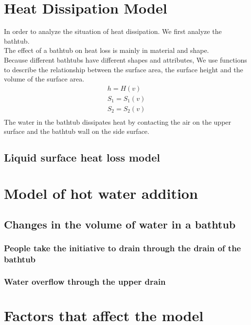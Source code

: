 \documentclass{mcmthesis}
\begin{document}
\section{Heat Dissipation Model}
In order to analyze the situation of heat dissipation. 
We first analyze the bathtub.\\
\indent The effect of a bathtub on heat loss is mainly in material and shape.\\
\indent Because different bathtubs have different shapes and attributes, We use functions to describe the relationship between the surface area, the surface height and the volume of the surface area.
\begin{equation}
\begin{split}
h=H(v)  \\
S_{1}=S_{1}(v) \\
S_{2}=S_{2}(v)  \\
\end{split}
\end{equation}
\indent The water in the bathtub dissipates heat by contacting the air on the upper surface and the bathtub wall on the side surface.

\subsection{Liquid surface heat loss model}%

\section{Model of hot water addition}
\subsection{Changes in the volume of water in a bathtub}

\subsubsection{People take the initiative to drain through the drain of the bathtub}

\subsubsection{Water overflow through the upper drain}
\section{Factors that affect the model}
\end{document}
